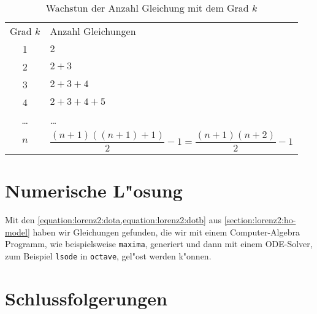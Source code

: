 \begin{refsection}
\begin{table}
	\centering
	\begin{tabular}{c | l}
		Grad $k$ & Anzahl Gleichungen \\
		1 & $2$ \\
		2 & $2 + 3$ \\
		3 & $2 + 3 + 4$\\
		4 & $2 + 3 + 4 + 5$\\
		\dots & \dots \\
		$n$ & $\dfrac{(n + 1)((n + 1) + 1)}{2} - 1
		= \dfrac{(n + 1)(n + 2)}{2} - 1$
	\end{tabular}
	\caption{Wachstun der Anzahl Gleichung mit dem Grad $k$}
	\label{table:lorenz2:degree}
\end{table}

\section{Numerische L"osung\label{section:lorenz2:numeric-solution}}
Mit den \cref{equation:lorenz2:dota,equation:lorenz2:dotb} aus 
\cref{section:lorenz2:ho-model} haben wir Gleichungen gefunden, die wir 
mit einem Computer-Algebra Programm, wie beispielsweise \texttt{maxima}, 
generiert und dann mit einem ODE-Solver, zum Beispiel \texttt{lsode} in 
\texttt{octave}, gel"ost werden k"onnen.

\section{Schlussfolgerungen}

\printbibliography[heading=subbibliography]
\end{refsection}
